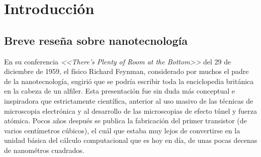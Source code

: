  \newcommand{\NoBiblioIntro}[1]{
 \ifthenelse{\equal{#1}{verdadero}}{}{}
 \NoBiblioIntro{verdadero}}


 \FormatoCapituloUnaLinea

 \chapter{Introducción}\label{chap:Introduccion}

 \thispagestyle{empty}
	

 
 \vfill
 \minitoc
 \newpage

\section{Breve reseña sobre nanotecnología}

	 En su conferencia \textit{<<There's Plenty of Room at the Bottom>>} del 29 de diciembre de 1959, el físico Richard Feynman, considerado por muchos el padre de la nanotecnología, sugirió que se podría escribir toda la enciclopedia británica en la cabeza de un alfiler.\cite{Feynman1959} Esta presentación fue sin duda más conceptual e inspiradora que estrictamente científica, anterior al uso masivo de las técnicas de microscopia electrónica y al desarrollo de las microscopias de efecto túnel y fuerza atómica. Pocos años después se publica la fabricación del primer transistor (de varios centímetros cúbicos), el cuál que estaba muy lejos de convertirse en la unidad básica del cálculo computacional que es hoy en día, de unas pocas decenas de nanométros cuadrados. 

